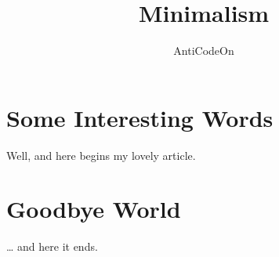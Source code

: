 \documentclass[a4paper,11pt]{article}
\author{AntiCodeOn}
\title{Minimalism}
\begin{document}
\maketitle
\tableofcontents
\section{Some Interesting Words}
Well, and here begins my lovely article.
\section{Goodbye World}
\ldots{} and here it ends.

\end{document}
